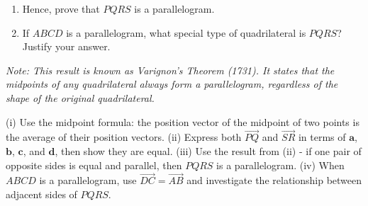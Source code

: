 \begin{problem}
\begin{enumerate}[label=(\roman*)]
    \item Hence, prove that $PQRS$ is a parallelogram.
    
    \item If $ABCD$ is a parallelogram, what special type of quadrilateral is $PQRS$? Justify your answer.
\end{enumerate}

\textit{Note: This result is known as Varignon's Theorem (1731). It states that the midpoints of any quadrilateral always form a parallelogram, regardless of the shape of the original quadrilateral.}
\end{problem}

\begin{hint}
(i) Use the midpoint formula: the position vector of the midpoint of two points is the average of their position vectors.
(ii) Express both $\overrightarrow{PQ}$ and $\overrightarrow{SR}$ in terms of $\mathbf{a}$, $\mathbf{b}$, $\mathbf{c}$, and $\mathbf{d}$, then show they are equal.
(iii) Use the result from (ii) - if one pair of opposite sides is equal and parallel, then $PQRS$ is a parallelogram.
(iv) When $ABCD$ is a parallelogram, use $\overrightarrow{DC} = \overrightarrow{AB}$ and investigate the relationship between adjacent sides of $PQRS$.
\end{hint}


